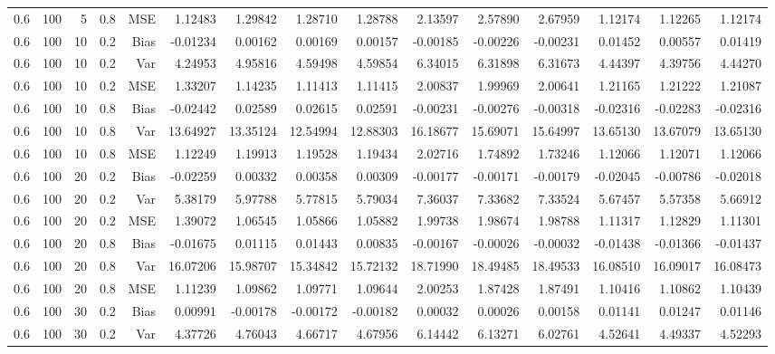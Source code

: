 \begin{table}[!htbp]
\begin{tabular}{lrrrrrrrrrrrrrr}
0.6 & 100 &  5 & 0.8 & MSE & 1.12483 & 1.29842 & 1.28710 & 1.28788 & 2.13597 & 2.57890 & 2.67959 & 1.12174 & 1.12265 & 1.12174 \\
0.6 & 100 & 10 & 0.2 & Bias & -0.01234 & 0.00162 & 0.00169 & 0.00157 & -0.00185 & -0.00226 & -0.00231 & 0.01452 & 0.00557 & 0.01419 \\
0.6 & 100 & 10 & 0.2 & Var & 4.24953 & 4.95816 & 4.59498 & 4.59854 & 6.34015 & 6.31898 & 6.31673 & 4.44397 & 4.39756 & 4.44270 \\
0.6 & 100 & 10 & 0.2 & MSE & 1.33207 & 1.14235 & 1.11413 & 1.11415 & 2.00837 & 1.99969 & 2.00641 & 1.21165 & 1.21222 & 1.21087 \\
0.6 & 100 & 10 & 0.8 & Bias & -0.02442 & 0.02589 & 0.02615 & 0.02591 & -0.00231 & -0.00276 & -0.00318 & -0.02316 & -0.02283 & -0.02316 \\
0.6 & 100 & 10 & 0.8 & Var & 13.64927 & 13.35124 & 12.54994 & 12.88303 & 16.18677 & 15.69071 & 15.64997 & 13.65130 & 13.67079 & 13.65130 \\
0.6 & 100 & 10 & 0.8 & MSE & 1.12249 & 1.19913 & 1.19528 & 1.19434 & 2.02716 & 1.74892 & 1.73246 & 1.12066 & 1.12071 & 1.12066 \\
0.6 & 100 & 20 & 0.2 & Bias & -0.02259 & 0.00332 & 0.00358 & 0.00309 & -0.00177 & -0.00171 & -0.00179 & -0.02045 & -0.00786 & -0.02018 \\
0.6 & 100 & 20 & 0.2 & Var & 5.38179 & 5.97788 & 5.77815 & 5.79034 & 7.36037 & 7.33682 & 7.33524 & 5.67457 & 5.57358 & 5.66912 \\
0.6 & 100 & 20 & 0.2 & MSE & 1.39072 & 1.06545 & 1.05866 & 1.05882 & 1.99738 & 1.98674 & 1.98788 & 1.11317 & 1.12829 & 1.11301 \\
0.6 & 100 & 20 & 0.8 & Bias & -0.01675 & 0.01115 & 0.01443 & 0.00835 & -0.00167 & -0.00026 & -0.00032 & -0.01438 & -0.01366 & -0.01437 \\
0.6 & 100 & 20 & 0.8 & Var & 16.07206 & 15.98707 & 15.34842 & 15.72132 & 18.71990 & 18.49485 & 18.49533 & 16.08510 & 16.09017 & 16.08473 \\
0.6 & 100 & 20 & 0.8 & MSE & 1.11239 & 1.09862 & 1.09771 & 1.09644 & 2.00253 & 1.87428 & 1.87491 & 1.10416 & 1.10862 & 1.10439 \\
0.6 & 100 & 30 & 0.2 & Bias & 0.00991 & -0.00178 & -0.00172 & -0.00182 & 0.00032 & 0.00026 & 0.00158 & 0.01141 & 0.01247 & 0.01146 \\
0.6 & 100 & 30 & 0.2 & Var & 4.37726 & 4.76043 & 4.66717 & 4.67956 & 6.14442 & 6.13271 & 6.02761 & 4.52641 & 4.49337 & 4.52293 \\

\end{tabular}
\end{table}
